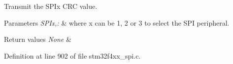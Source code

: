 Transmit the S\-P\-Ix C\-R\-C value. 


\begin{DoxyParams}{Parameters}
{\em S\-P\-Ix,\-:} & where x can be 1, 2 or 3 to select the S\-P\-I peripheral. \\
\hline
\end{DoxyParams}

\begin{DoxyRetVals}{Return values}
{\em None} & \\
\hline
\end{DoxyRetVals}


Definition at line 902 of file stm32f4xx\-\_\-spi.\-c.

